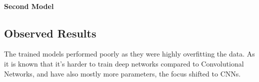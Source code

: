 \paragraph{Second Model}

\subsection{Observed Results}
The trained models performed poorly as they were highly overfitting the data.
As it is known that it's harder to train deep networks compared to Convolutional Networks, and have also mostly more parameters,
the focus shifted to CNNs.
